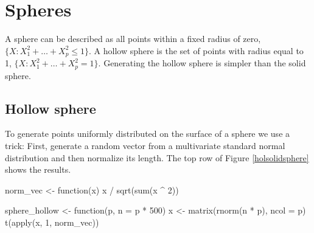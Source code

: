 \section{Spheres}

A sphere can be described as all
points within a fixed radius of zero, $\{X: X_1^2+\dots + X_p^2 \leq 1\}$.  A hollow sphere is the set of points with radius equal to 1, $\{X: X_1^2+\dots + X_p^2 = 1\}$. Generating the hollow sphere is simpler than the solid sphere.

\subsection{Hollow sphere}

To generate points uniformly distributed on the surface of a sphere we
use a trick: First, generate a random vector from a multivariate
standard normal distribution and then normalize its length. The top
row of Figure \ref{holsolidsphere} shows the results.

\begin{example}
norm_vec <- function(x) {
  x / sqrt(sum(x ^ 2))
}

sphere_hollow <- function(p, n = p * 500) {
  x <- matrix(rnorm(n * p), ncol = p)
  t(apply(x, 1, norm_vec))
}
\end{example}

